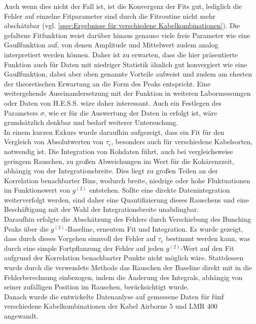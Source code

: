 Auch wenn dies nicht der Fall ist, ist die Konvergenz der Fits gut, lediglich die Fehler auf einzelne Fitparameter sind durch die Fitroutine nicht mehr abschätzbar (vgl. \autoref{ssec:Ergebnisse für verschiedene Kabelkombinationen}). 
Die gefaltene Fitfunktion weist darüber hinaus genauso viele freie Parameter wie eine Gaußfunktion auf, von denen Amplitude und Mittelwert zudem analog interpretiert werden können. 
Daher ist zu erwarten, dass die hier präsentierte Funktion auch für Daten mit niedriger Statistik ähnlich gut konvergiert wie eine Gaußfunktion, dabei aber oben genannte Vorteile aufweist und zudem am ehesten der theoretischen Erwartung an die Form des Peaks entspricht. 
Eine weitergehende Auseinandersetzung mit der Funktion in weiteren Labormessungen oder Daten von H.E.S.S. wäre daher interessant. 
Auch ein Festlegen des Parameters $\sigma$, wie er für die Auswertung der Daten in \cite{zmijaFirstIntensityInterferometry2023} erfolgt ist, wäre grundsätzlich denkbar und bedarf weiterer Untersuchung. \\
In einem kurzen Exkurs wurde daraufhin aufgezeigt, dass ein Fit für den Vergleich von Absolutwerten von $\tau_\mathrm{c}$, besonders auch für verschiedene Kabelsorten, notwendig ist. 
Die Integration von Rohdaten führt, auch bei vergleichsweise geringem Rauschen, zu großen Abweichungen im Wert für die Kohärenzzeit, abhängig von der Integrationsbreite. 
Dies liegt zu großen Teilen an der Korrelation benachbarter Bins, wodurch breite, niedrige oder hohe Fluktuationen im Funktionswert von $g^{(2)}$ entstehen. 
Sollte eine direkte Datenintegration weiterverfolgt werden, sind daher eine Quantifizierung dieses Rauschens und eine Beschäftigung mit der Wahl der Integrationsbreite unabdingbar. \\
Daraufhin erfolgte die Abschätzung des Fehlers durch Verschiebung des Bunching Peaks über die $g^{(2)}$-Baseline, erneutem Fit und Integration. 
Es wurde gezeigt, dass durch dieses Vorgehen sinnvoll der Fehler auf $\tau_\mathrm{c}$ bestimmt werden kann, was durch eine simple Fortpflanzung der Fehler auf jeden $g^{(2)}$-Wert auf den Fit aufgrund der Korrelation benachbarter Punkte nicht möglich wäre. 
Stattdessen wurde durch die verwendete Methode das Rauschen der Baseline direkt mit in die Fehlerberechnung einbezogen, indem die Änderung des Integrals, abhängig von seiner zufälligen Position im Rauschen, berücksichtigt wurde. \\
Danach wurde die entwickelte Datenanlyse auf gemessene Daten für fünf verschiedene Kabelkombinationen der Kabel Airborne 5 und LMR 400 angewandt. 
